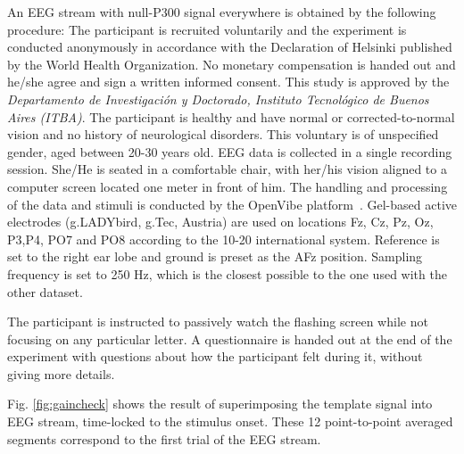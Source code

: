 \documentclass[sensors,article,submit,moreauthors,pdftex,10pt,a4paper]{mdpi}
\begin{document}
An EEG stream with null-P300 signal everywhere is obtained by the following procedure: 
The participant is recruited voluntarily and the experiment is conducted anonymously in accordance with the Declaration of Helsinki published by the World Health Organization.  No monetary compensation is handed out and he/she agree and sign a written informed consent.  This study is approved by the \textit{Departamento de Investigación y Doctorado, Instituto Tecnológico de Buenos Aires (ITBA)}.  The participant is healthy and have normal or corrected-to-normal vision and no history of neurological disorders. This voluntary is of unspecified gender, aged between 20-30 years old.  EEG data is collected in a single recording session. She/He is seated in a comfortable chair, with her/his vision aligned to a computer screen located one meter in front of him.  The handling and processing of the data and stimuli is conducted by the OpenVibe platform~\citep{Renard2010}.  Gel-based active electrodes (g.LADYbird, g.Tec, Austria) are used on locations Fz, Cz, Pz, Oz, P3,P4, PO7 and PO8 according to the 10-20 international system.  Reference is set to the right ear lobe and ground is preset as the AFz position.   Sampling frequency is set to 250 Hz, which is the closest possible to the one used with the other dataset. 

The participant is instructed to passively watch the flashing screen while not focusing on any particular letter.  A questionnaire is handed out at the end of the experiment with questions about how the participant felt during it, without giving more details.  


Fig. \ref{fig:gaincheck} shows the result of superimposing the template signal into EEG stream, time-locked to the stimulus onset.   These 12 point-to-point averaged segments correspond to the first trial of the EEG stream.

\end{document}
